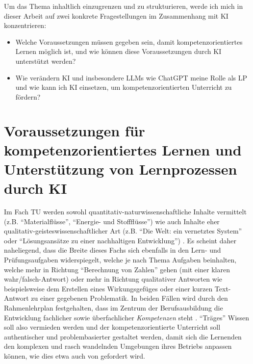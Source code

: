 Um das Thema inhaltlich einzugrenzen und zu strukturieren, werde ich mich in dieser Arbeit auf zwei konkrete Fragestellungen im Zusammenhang mit \gls{KI} konzentrieren:

\begin{itemize}
    \item Welche Voraussetzungen müssen gegeben sein, damit kompetenzorientiertes Lernen möglich ist, und wie können diese Voraussetzungen durch \gls{KI} unterstützt werden?
    \item Wie verändern \gls{KI} und insbesondere \glspl{LLM} wie ChatGPT meine Rolle als \gls{LP} und wie kann ich \gls{KI} einsetzen, um kompetenzorientierten Unterricht zu fördern?
\end{itemize}

\section{Voraussetzungen für kompetenzorientiertes Lernen und Unterstützung von Lernprozessen durch \gls{KI}}

Im Fach \gls{TU} werden sowohl quantitativ-naturwissenschaftliche Inhalte vermittelt (z.B. \enquote{Materialflüsse}, \enquote{Energie- und Stoffflüsse}) wie auch Inhalte eher qualitativ-geisteswissenschaftlicher Art (z.B. \enquote{Die Welt: ein vernetztes System} oder \enquote{Lösungsansätze zu einer nachhaltigen Entwicklung}) \cite{sbfi}. Es scheint daher naheliegend, dass die Breite dieses Fachs sich ebenfalls in den Lern- und Prüfungsaufgaben widerspiegelt, welche je nach Thema Aufgaben beinhalten, welche mehr in Richtung \enquote{Berechnung von Zahlen} gehen (mit einer klaren wahr/falsch-Antwort) oder mehr in Richtung qualitativer Antworten wie beispielsweise dem Erstellen eines Wirkungsgefüges oder einer kurzen Text-Antwort zu einer gegebenen Problematik. In beiden Fällen wird durch den Rahmenlehrplan festgehalten, dass im Zentrum der Berufsausbildung die Entwicklung fachlicher sowie überfachlicher \textit{Kompetenzen} steht \cite[7-8]{sbfi}. \enquote{Träges} Wissen soll also vermieden werden und der kompetenzorientierte Unterricht soll authentischer und problembasierter gestaltet werden, damit sich die Lernenden den komplexen und rasch wandelnden Umgebungen ihres Betriebs anpassen können, wie dies etwa auch von \textcite[107-117]{alma99117272661305511} gefordert wird.

